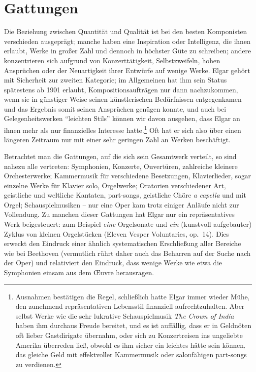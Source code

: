 \documentclass[a4paper,11pt,open=any]{scrbook}
\begin{document}
\section{Gattungen}
Die Beziehung zwischen Quantität und Qualität ist bei den besten
Komponisten verschieden ausgeprägt; manche haben eine Inspiration oder
Intelligenz, die ihnen erlaubt, Werke in großer Zahl und dennoch in
höchster Güte zu schreiben; andere konzentrieren sich aufgrund von
Konzerttätigkeit, Selbstzweifeln, hohen Ansprüchen oder der Neuartigkeit
ihrer Entwürfe auf wenige Werke.  Elgar gehört mit Sicherheit zur
zweiten Kategorie; im Allgemeinen hat ihm sein Status spätestens ab 1901
erlaubt, Kompositionsaufträgen nur dann nachzukommen, wenn sie in günstiger
Weise seinen künstlerischen Bedürfnissen entgegenkamen und das Ergebnis
somit seinen Ansprüchen genügen konnte, und auch bei Gelegenheitswerken
\enquote{leichten Stils} können wir davon ausgehen, dass Elgar an ihnen mehr
als nur finanzielles Interesse hatte.\footnote{Ausnahmen bestätigen
die Regel, schließlich hatte Elgar immer wieder Mühe, den zunehmend
repräsentativen Lebensstil finanziell aufrechtzuhalten.  Aber selbst Werke
wie die sehr lukrative Schauspielmusik \textit{The Crown of India} haben
ihm durchaus Freude bereitet, und es ist auffällig, dass er in Geldnöten
oft lieber Gastdirigate übernahm, oder sich zu Konzertreisen ins ungeliebte
Amerika überreden ließ, obwohl es ihm sicher ein leichtes hätte sein können, das
gleiche Geld mit effektvoller Kammermusik oder salonfähigen part-songs zu
verdienen.}  Oft hat er sich also über einen längeren Zeitraum nur mit einer
sehr geringen Zahl an Werken beschäftigt.

Betrachtet man die Gattungen, auf die sich sein Gesamtwerk verteilt,
so sind nahezu alle vertreten: Symphonien, Konzerte, Ouvertüren,
zahlreiche kleinere Orchesterwerke; Kammermusik für verschiedene
Besetzungen, Klavierlieder, sogar einzelne Werke für Klavier solo,
Orgelwerke; Oratorien verschiedener Art, geistliche und weltliche
Kantaten, part-songs, geistliche Chöre \textit{a capella} und mit Orgel;
Schauspielmusiken – nur eine Oper kam trotz einiger Anläufe nicht zur
Vollendung.  Zu manchen dieser Gattungen hat Elgar nur ein repräsentatives
Werk beigesteuert: zum Beispiel \textit{eine} Orgelsonate und \textit{ein}
(kunstvoll aufgebauter\cite[S.~114]{butt-rcath}) Zyklus von kleinen
Orgelstücken (Eleven Vesper Voluntaries, op.~14).  Dies erweckt den
Eindruck einer ähnlich systematischen Erschließung aller Bereiche wie
bei Beethoven (vermutlich rührt daher auch das Beharren auf der Suche
nach der Oper) und relativiert den Eindruck, dass wenige Werke wie etwa
die Symphonien einsam aus dem Œuvre herausragen.
\end{document}
